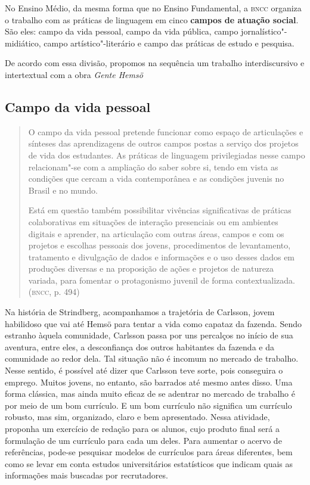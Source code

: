 \documentclass[12pt]{extarticle}
\begin{document}

No Ensino Médio, da mesma forma que no Ensino Fundamental, a \textsc{bncc}
organiza o trabalho com as práticas de linguagem em cinco \textbf{campos
de atuação social}. São eles: campo da vida pessoal, campo da vida
pública, campo jornalístico"-midiático, campo artístico"-literário e campo
das práticas de estudo e pesquisa.

De acordo com essa divisão, propomos na sequência um trabalho
interdiscursivo e intertextual com a obra \emph{Gente Hemsö}

\subsection{Campo da vida pessoal}

\begin{quote}
O campo da vida pessoal pretende funcionar como espaço de articulações
e sínteses das aprendizagens de outros campos postas a serviço dos
projetos de vida dos estudantes. As práticas de linguagem privilegiadas
nesse campo relacionam"-se com a ampliação do saber sobre si, tendo em
vista as condições que cercam a vida contemporânea e as condições
juvenis no Brasil e no mundo.

Está em questão também possibilitar vivências significativas de práticas
colaborativas em situações de interação presenciais ou em ambientes
digitais e aprender, na articulação com outras áreas, campos e com os
projetos e escolhas pessoais dos jovens, procedimentos de levantamento,
tratamento e divulgação de dados e informações e o uso desses dados em
produções diversas e na proposição de ações e projetos de natureza
variada, para fomentar o protagonismo juvenil de forma
contextualizada. (\textsc{bncc}, p. 494)
\end{quote}

Na história de Strindberg, acompanhamos a trajetória de Carlsson,
jovem habilidoso que vai até Hemsö para tentar a vida como capataz da
fazenda. Sendo estranho àquela comunidade, Carlsson passa por uns
percalços no início de sua aventura, entre eles, a desconfiança dos
outros habitantes da fazenda e da comunidade ao redor dela. Tal
situação não é incomum no mercado de trabalho. Nesse sentido, é
possível até dizer que Carlsson teve sorte, pois conseguira o emprego.
Muitos jovens, no entanto, são barrados até mesmo antes disso. Uma
forma clássica, mas ainda muito eficaz de se adentrar no mercado de
trabalho é por meio de um bom currículo. E um bom currículo não
significa um currículo robusto, mas sim, organizado, claro e bem
apresentado. Nessa atividade, proponha um exercício de redação para os
alunos, cujo produto final será a formulação de um currículo para cada
um deles. Para aumentar o acervo de referências, pode-se pesquisar
modelos de currículos para áreas diferentes, bem como se levar em
conta estudos universitários estatísticos que indicam quais as
informações mais buscadas por recrutadores.
\end{document}
